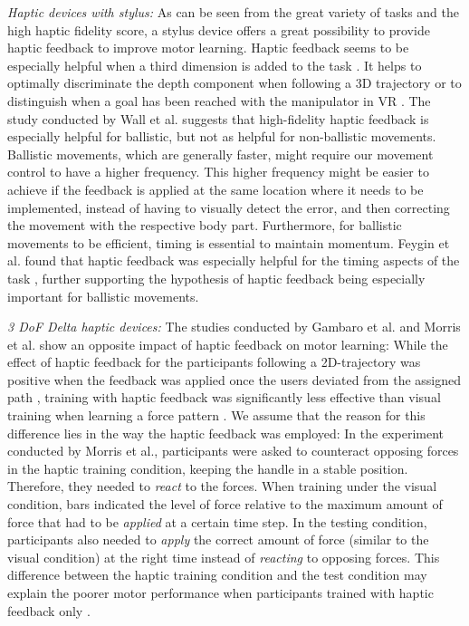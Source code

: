 \textit{Haptic devices with stylus:} 
As can be seen from the great variety of tasks and the high haptic fidelity score, a stylus device offers a great possibility to provide haptic feedback to improve motor learning. Haptic feedback seems to be especially helpful when a third dimension is added to the task \cite{Feygin2002HapticSkill, Rodriguez2010, Gunter2022, Brickler2019}. It helps to optimally discriminate the depth component when following a 3D trajectory or to distinguish when a goal has been reached with the manipulator in VR \cite{Wall2000}. 
The study conducted by Wall et al. suggests that high-fidelity haptic feedback is especially helpful for ballistic, but not as helpful for non-ballistic movements. Ballistic movements, which are generally faster, might require our movement control to have a higher frequency. This higher frequency might be easier to achieve if the feedback is applied at the same location where it needs to be implemented, instead of having to visually detect the error, and then correcting the movement with the respective body part. Furthermore, for ballistic movements to be efficient, timing is essential to maintain momentum. Feygin et al. found that haptic feedback was especially helpful for the timing aspects of the task \cite{Feygin2002HapticSkill}, further supporting the hypothesis of haptic feedback being especially important for ballistic movements. 

\textit{3 DoF Delta haptic devices:}
The studies conducted by Gambaro et al. and Morris et al. show an opposite impact of haptic feedback on motor learning: While the effect of haptic feedback for the participants following a 2D-trajectory was positive when the feedback was applied once the users deviated from the assigned path \cite{Gambaro2014}, training with haptic feedback was significantly less effective than visual training when learning a force pattern \cite{Morris2007}. We assume that the reason for this difference lies in the way the haptic feedback was employed: In the experiment conducted by Morris et al., participants were asked to counteract opposing forces in the haptic training condition, keeping the handle in a stable position. Therefore, they needed to \textit{react} to the forces. 
When training under the visual condition, bars indicated the level of force relative to the maximum amount of force that had to be \textit{applied} at a certain time step. 
In the testing condition, participants also needed to \textit{apply} the correct amount of force (similar to the visual condition) at the right time instead of \textit{reacting} to opposing forces. 
This difference between the haptic training condition and the test condition may explain the poorer motor performance when participants trained with haptic feedback only \cite{Morris2007}.

